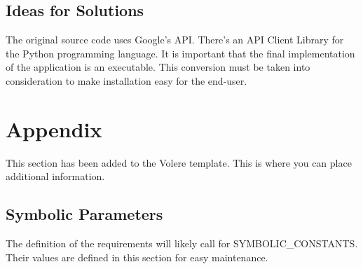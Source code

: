 \documentclass[12pt, titlepage]{article}
\begin{document}
\subsection{Ideas for Solutions}
\hspace{5mm}
The original source code uses Google's API.  There's an API Client Library for the Python programming language. It is important that the final implementation of the application is an executable. This conversion must be taken into consideration to make installation easy for the end-user.






\newpage

\section{Appendix}

This section has been added to the Volere template.  This is where you can place
additional information.

\subsection{Symbolic Parameters}

The definition of the requirements will likely call for SYMBOLIC\_CONSTANTS.
Their values are defined in this section for easy maintenance.
\end{document}
